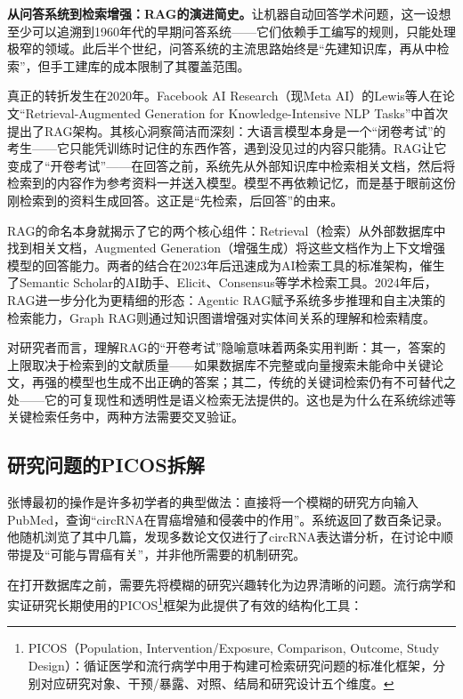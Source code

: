 \begin{funbox}
\textbf{从问答系统到检索增强：RAG的演进简史。}让机器自动回答学术问题，这一设想至少可以追溯到1960年代的早期问答系统——它们依赖手工编写的规则，只能处理极窄的领域。此后半个世纪，问答系统的主流思路始终是``先建知识库，再从中检索''，但手工建库的成本限制了其覆盖范围。

真正的转折发生在2020年。Facebook AI Research（现Meta AI）的Lewis等人在论文``Retrieval-Augmented Generation for Knowledge-Intensive NLP Tasks''中首次提出了RAG架构。其核心洞察简洁而深刻：大语言模型本身是一个``闭卷考试''的考生——它只能凭训练时记住的东西作答，遇到没见过的内容只能猜。RAG让它变成了``开卷考试''——在回答之前，系统先从外部知识库中检索相关文档，然后将检索到的内容作为参考资料一并送入模型。模型不再依赖记忆，而是基于眼前这份刚检索到的资料生成回答。这正是``先检索，后回答''的由来。

RAG的命名本身就揭示了它的两个核心组件：Retrieval（检索）从外部数据库中找到相关文档，Augmented Generation（增强生成）将这些文档作为上下文增强模型的回答能力。两者的结合在2023年后迅速成为AI检索工具的标准架构，催生了Semantic Scholar的AI助手、Elicit、Consensus等学术检索工具。2024年后，RAG进一步分化为更精细的形态：Agentic RAG赋予系统多步推理和自主决策的检索能力，Graph RAG则通过知识图谱增强对实体间关系的理解和检索精度。

对研究者而言，理解RAG的``开卷考试''隐喻意味着两条实用判断：其一，答案的上限取决于检索到的文献质量——如果数据库不完整或向量搜索未能命中关键论文，再强的模型也生成不出正确的答案；其二，传统的关键词检索仍有不可替代之处——它的可复现性和透明性是语义检索无法提供的。这也是为什么在系统综述等关键检索任务中，两种方法需要交叉验证。
\end{funbox}

\subsection{研究问题的PICOS拆解}

张博最初的操作是许多初学者的典型做法：直接将一个模糊的研究方向输入PubMed，查询``circRNA在胃癌增殖和侵袭中的作用''。系统返回了数百条记录。他随机浏览了其中几篇，发现多数论文仅进行了circRNA表达谱分析，在讨论中顺带提及``可能与胃癌有关''，并非他所需要的机制研究。

在打开数据库之前，需要先将模糊的研究兴趣转化为边界清晰的问题。流行病学和实证研究长期使用的PICOS\footnote{PICOS（Population, Intervention/Exposure, Comparison, Outcome, Study Design）：循证医学和流行病学中用于构建可检索研究问题的标准化框架，分别对应研究对象、干预/暴露、对照、结局和研究设计五个维度。}框架为此提供了有效的结构化工具：

